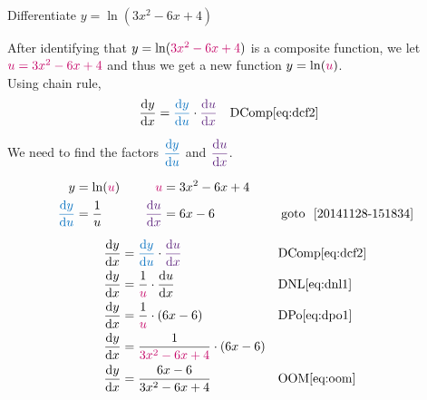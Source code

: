 \documentclass[20150903-160354-rs2.2-MarksMathNotebook.tex]{subfiles}
\begin{document}
\begin{example}[id:20141128-160248] \label{20141128-160248} \hfill \\

Differentiate $y=\ln(3x^2-6x+4)$

\soln

\solnsteps
After identifying that $y=\ln (\cRed{3x^2-6x+4})$ is a composite function, we let \\
$\cRed{u=3x^2-6x+4}$ and thus we get a new function $y=\ln (\cRed{u})$.\\

Using chain rule,
\begin{align*}
\dydx &= \cBlue{\dydu} \cdot \cPurple{\dudx} && \text{DComp} \eqref{eq:dcf2}
\end{align*}

We need to find the factors $\cBlue{\dydu}$ and $\cPurple{\dudx}$.

\begin{alignat*}{3}
		y &= \ln (\cRed{u})				&\quad	 			\cRed{u} 	&= 3x^2-6x+4 	&\quad\\
	\cBlue{\dydu} &= \dfrac{1}{u}		&\quad 	 \cPurple{\dudx}	 &= 6x-6 		&\quad \text{\, goto \,} \, \ref{20141128-151834}
\end{alignat*}

\begin{align*}
\dydx &= \cBlue{\dydu} \cdot \cPurple{\dudx} && \text{DComp} \eqref{eq:dcf2} \\
\dydx &= \dfrac{1}{\cRed{u}} \cdot \dudx && \text{DNL} \eqref{eq:dnl1} \\
\dydx &= \dfrac{1}{\cRed{u}} \cdot (6x-6) && \text{DPo} \eqref{eq:dpo1} \\
\dydx &= \dfrac{1}{\cRed{3x^2-6x+4}} \cdot (6x-6) \\	%
\dydx &= \dfrac{6x-6}{3x^2-6x+4} && \text{OOM} \eqref{eq:oom}
\end{align*}
\end{example}
\end{document}
